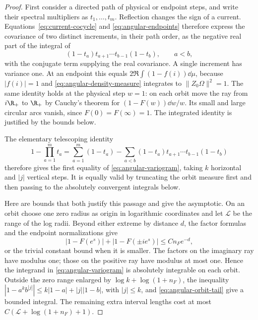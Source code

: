 \begin{proof}
First consider a directed path of physical or endpoint steps, and write
their spectral multipliers as $t_1,\ldots,t_m$.  Reflection changes
the sign of a current.  Equations~\eqref{eq:current-cocycle} and
\eqref{eq:angular-endpoints} therefore express the covariance of two
distinct increments, in their path order, as the negative real part of
the integral of
\[
 (1-t_a)t_{a+1}\cdots t_{b-1}(1-t_b),\qquad a<b,
\]
with the conjugate term supplying the real covariance.  A single
increment has variance one.  At an endpoint this equals
$2\Re\int(1-f(i))\dd\mu$, because $|f(i)|=1$ and
\eqref{eq:angular-density-measure} integrates to
$\|Z_0\Omega\|^2=1$.  The same identity holds at the physical step
$w=1$: on each orbit move the ray from $i\R_+$ to $\R_+$ by Cauchy's
theorem for $(1-F(w))\dd w/w$.  Its small and large circular arcs
vanish, since $F(0)=F(\infty)=1$.  The integrated identity is
justified by the bounds below.

The elementary telescoping identity
\[
 1-\prod_{a=1}^m t_a
 =\sum_{a=1}^m(1-t_a)
  -\sum_{a<b}(1-t_a)t_{a+1}\cdots t_{b-1}(1-t_b)
\]
therefore gives the first equality of
\eqref{eq:angular-variogram}, taking $k$ horizontal and $|j|$
vertical steps.  It is equally valid by truncating the orbit measure
first and then passing to the absolutely convergent integrals below.

Here are bounds that both justify this passage and give the asymptotic.
On an orbit choose one zero radius as origin in logarithmic coordinates
and let $\mathcal L$ be the range of the log radii.  Beyond either
extreme by distance $d$, the factor formulas and the endpoint
normalizations give
\begin{equation}\label{eq:angular-orbit-tail}
 |1-F(e^s)|+|1-F(\pm i e^s)|\le Cn_F e^{-d},
\end{equation}
or the trivial constant bound when it is smaller.  The factors on the
imaginary ray have modulus one; those on the positive ray have modulus
at most one.  Hence the integrand in
\eqref{eq:angular-variogram} is absolutely integrable on each orbit.
Outside the zero range enlarged by $\log k+\log(1+n_F)$, the inequality
$|1-a^kb^{|j|}|\le k|1-a|+|j||1-b|$, with $|j|\le k$, and
\eqref{eq:angular-orbit-tail} give a bounded integral.  The remaining
extra interval lengths cost at most
$C(\mathcal L+\log(1+n_F)+1)$.


\end{proof}
